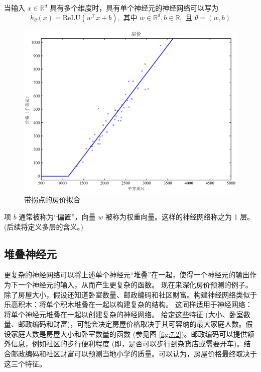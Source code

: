 当输入 $x \in \mathbb{R}^d$ 具有多个维度时，具有单个神经元的神经网络可以写为
\begin{equation}
    \bar{h}_\theta(x) = \text{ReLU}(w^\top x + b), \text{ 其中 } w \in \mathbb{R}^d, b \in \mathbb{R}, \text{ 且 } \theta = (w, b)
    \label{eq:7.12}
\end{equation}

\begin{figure}[H]
    \centering
    \includegraphics[width=0.5\linewidth]{figs/house_dataset_relu.pdf}
    \caption{带拐点的房价拟合}
    \label{fig:7.1}
\end{figure}

项 $b$ 通常被称为“偏置”，向量 $w$ 被称为权重向量。这样的神经网络称之为 1 层。(后续将定义多层的含义。)

\subsection*{堆叠神经元}

更复杂的神经网络可以将上述单个神经元“堆叠”在一起，使得一个神经元的输出作为下一个神经元的输入，从而产生更复杂的函数。
现在来深化房价预测的例子。除了房屋大小，假设还知道卧室数量、邮政编码和社区财富。构建神经网络类似于乐高积木：将单个积木堆叠在一起以构建复杂的结构。 这同样适用于神经网络：将单个神经元堆叠在一起以创建复杂的神经网络。
给定这些特征 (大小、卧室数量、邮政编码和财富)，可能会决定房屋价格取决于其可容纳的最大家庭人数。假设家庭人数是房屋大小和卧室数量的函数 (参见图 \ref{fig:7.2})。邮政编码可以提供额外信息，例如社区的步行便利程度 (即，是否可以步行到杂货店或需要开车)。结合邮政编码和社区财富可以预测当地小学的质量。可以认为，房屋价格最终取决于这三个特征。


